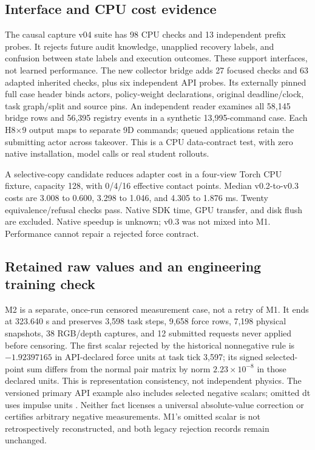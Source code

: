 \documentclass{article}
\begin{document}
\subsection{Interface and CPU cost evidence}
The causal capture v04 suite has 98 CPU checks and 13 independent prefix probes. It rejects future audit knowledge, unapplied recovery labels, and confusion between state labels and execution outcomes. These support interfaces, not learned performance. The new collector bridge adds 27 focused checks and 63 adapted inherited checks, plus six independent API probes. Its externally pinned full case header binds actors, policy-weight declarations, original deadline/clock, task graph/split and source pins. An independent reader examines all 58,145 bridge rows and 56,395 registry events in a synthetic 13,995-command case. Each H8$\times$9 output maps to separate 9D commands; queued applications retain the submitting actor across takeover. This is a CPU data-contract test, with zero native installation, model calls or real student rollouts.

A selective-copy candidate reduces adapter cost in a four-view Torch CPU fixture, capacity 128, with 0/4/16 effective contact points. Median v0.2-to-v0.3 costs are 3.008 to 0.600, 3.298 to 1.046, and 4.305 to 1.876 ms. Twenty equivalence/refusal checks pass. Native SDK time, GPU transfer, and disk flush are excluded. Native speedup is unknown; v0.3 was not mixed into M1. Performance cannot repair a rejected force contract.

\subsection{Retained raw values and an engineering training check}
M2 is a separate, once-run censored measurement case, not a retry of M1. It ends at 323.640 s and preserves 3,598 task steps, 9,658 force rows, 7,198 physical snapshots, 38 RGB/depth captures, and 12 submitted requests never applied before censoring. The first scalar rejected by the historical nonnegative rule is $-1.92397165$ in API-declared force units at task tick 3,597; its signed selected-point sum differs from the normal pair matrix by norm $2.23\times10^{-8}$ in those declared units. This is representation consistency, not independent physics. The versioned primary API example also includes selected negative scalars; omitted dt uses impulse units \citep{nvidia_contact_nd}. Neither fact licenses a universal absolute-value correction or certifies arbitrary negative measurements. M1's omitted scalar is not retrospectively reconstructed, and both legacy rejection records remain unchanged.
\end{document}
